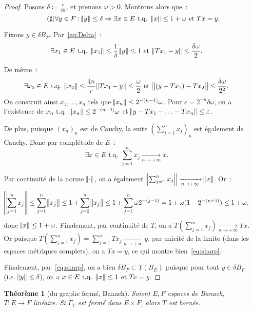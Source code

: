 \documentclass{report}
\newcommand{\tq}{\text{ t.q. }}
\newcommand{\st}{\tq}
\newcommand{\pinfty}{{+\infty}}
\newtheorem{thm}{Théorème}[chapter]
\theoremstyle{definition}
\theoremstyle{remark}
\begin{document}
\begin{proof}
Posons $\delta \coloneqq \frac r{4n}$, et prenons $\omega > 0$. Montrons alors que~:
\begin{equation}\tag{$\sharp$}\label{eq:sharp}
	\forall y \in F : \norm y \leq \delta \Rightarrow \exists x \in E \st \norm x \leq 1+\omega \text{ et } Tx = y.
\end{equation}

Fixons $y \in \delta B_F$. Par~\eqref{eq:Delta}~:
\[\exists x_1 \in E \st \norm {x_1} \leq \frac 1\delta\norm y \leq 1 \text{ et } \norm {Tx_1-y} \leq \frac {\delta\omega}2.\]

De même~:
\[\exists x_2 \in E \st \norm {x_2} \leq \frac {4n}r\norm {Tx_1 - y} \leq \frac \omega2 \text{ et } \norm {(y-Tx_1) - Tx_2} \leq \frac {\delta\omega}{2^2}.\]
On construit ainsi $x_1, \ldots, x_n$ tels que $\norm {x_n} \leq 2^{-(n-1)}\omega$. Pour $\varepsilon = 2^{-n}\delta\omega$, on a l'existence de
$x_n \st \norm {x_n} \leq 2^{-(n-1)}\omega$ et $\norm {y-Tx_1-\ldots-Tx_n} \leq \varepsilon$.

De plus, puisque $(x_n)_n$ est de Cauchy, la suite $(\sum_{j=1}^nx_j)_n$ est également de Cauchy. Donc par complétude de $E$~:
\[\exists x \in E \st \sum_{j=1}^nx_j \xrightarrow[n \to \pinfty]{} x.\]

Par continuité de la norme $\norm \cdot$, on a également $\norm {\sum_{j=1}^nx_j} \xrightarrow[n \to \pinfty]{} \norm x$. Or~:
\[\norm {\sum_{j=1}^nx_j} \leq \sum_{j=1}^n\norm {x_j} \leq 1 + \sum_{j=2}^n\norm {x_j} \leq 1 + \sum_{j=1}^n\omega 2^{-(j-1)} = 1 + \omega(1 - 2^{-(n+1)}) \leq 1+\omega,\]
donc $\norm x \leq 1+\omega$. Finalement, par continuité de $T$, on a
$T(\sum_{j=1}^nx_j) \xrightarrow[n \to \pinfty]{} Tx$. Or puisque $T(\sum_{j=1}^nx_j) = \sum_{j=1}^nTx_j \xrightarrow[n \to \pinfty]{} y$, par unicité de la limite
(dans les espaces métriques complets), on a $Tx=y$,
ce qui montre bien~\eqref{eq:sharp}.

Finalement, par~\eqref{eq:sharp}, on a bien $\delta B_F \subset T(B_E)$ puisque pour tout $y \in \delta B_F$ (i.e. $\norm y \leq \delta$), on a $x \in E \st \norm x \leq 1$
et $Tx = y$.
\end{proof}

\begin{thm}[du graphe fermé, Banach]\label{thm:graphe fermé} Soient $E, F$ espaces de Banach, $T : E \to F$ linéaire. Si $\Gamma_T$ est fermé dans $E \times F$, alors $T$ est bornée.
\end{thm}
\end{document}
